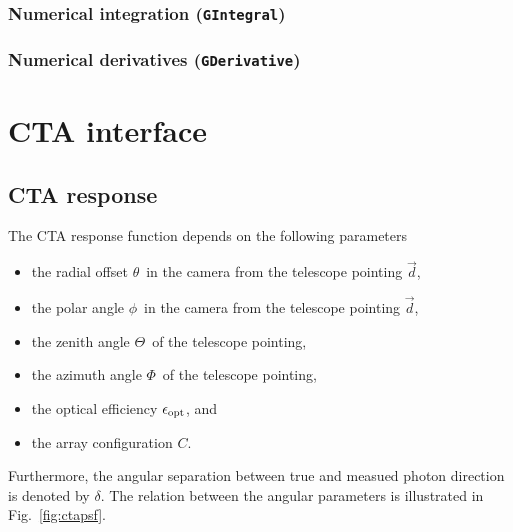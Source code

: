 \documentclass{article}[12pt,a4]
\begin{document}
\subsubsection{Numerical integration ({\tt GIntegral})}
\label{sec:integration}

\subsubsection{Numerical derivatives ({\tt GDerivative})}
\label{sec:integration}


\newpage
\section{CTA interface}

\subsection{CTA response}

\newcommand{\teldir}{\mbox{$\vec{d}$}}
\newcommand{\srcdir}{\mbox{$\vec{p}$}}
\newcommand{\phdir}{\mbox{$\vec{p'}$}}
\newcommand{\off}{\mbox{$\theta$}}
\newcommand{\polar}{\mbox{$\phi$}}
\newcommand{\zen}{\mbox{$\Theta$}}
\newcommand{\azm}{\mbox{$\Phi$}}
\newcommand{\opt}{\mbox{$\epsilon_{\rm opt}$}}
\newcommand{\conf}{\mbox{$C$}}
\newcommand{\psfsep}{\mbox{$\delta$}}

The CTA response function depends on the following parameters
\begin{itemize}
\item the radial offset \off\ in the camera from the telescope pointing \teldir,
\item the polar angle \polar\ in the camera from the telescope pointing \teldir,
\item the zenith angle \zen\ of the telescope pointing,
\item the azimuth angle \azm\ of the telescope pointing,
\item the optical efficiency \opt, and
\item the array configuration \conf.
\end{itemize}
Furthermore, the angular separation between true and measued photon direction is
denoted by \psfsep.
The relation between the angular parameters is illustrated in Fig.~\ref{fig:ctapsf}.
\end{document}

